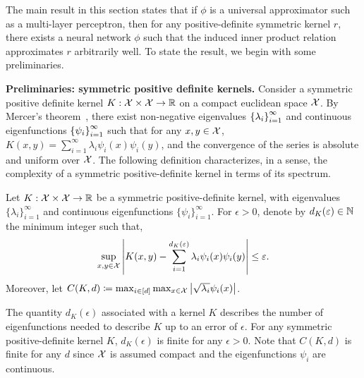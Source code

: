 The main result in this section states that if $\phi$ is a universal approximator such as a multi-layer perceptron, then for any positive-definite symmetric kernel $r$, there exists a neural network $\phi$ such that the induced inner product relation approximates $r$ arbitrarily well. To state the result, we begin with some preliminaries.

\textbf{Preliminaries: symmetric positive definite kernels.} Consider a symmetric positive definite kernel $K: {\mathcal{X}} \times {\mathcal{X}} \to \mathbb{R}$ on a compact euclidean space ${\mathcal{X}}$. By Mercer's theorem~\parencite{mercerFunctionsPositive1909, sunMercerTheorem2005, micchelliUniversalKernels2006}, there exist non-negative eigenvalues $\left\{\lambda_i\right\}_{i=1}^{\infty}$ and continuous eigenfunctions $\left\{\psi_i\right\}_{i=1}^{\infty}$ such that for any $x,y \in {\mathcal{X}}$, $K(x, y) = \sum_{i=1}^\infty \lambda_i \psi_i(x) \psi_i(y)$, and the convergence of the series is absolute and uniform over ${\mathcal{X}}$. The following definition characterizes, in a sense, the complexity of a symmetric positive-definite kernel in terms of its spectrum.

\begin{assumption}\label{ass:sym_pd_ker_specturm_decay}
	Let $K: {\mathcal{X}} \times {\mathcal{X}} \to \mathbb{R}$ be a symmetric positive-definite kernel, with eigenvalues $\{\lambda_i\}_{i=1}^{\infty}$ and continuous eigenfunctions $\{\psi_i\}_{i=1}^{\infty}$. For $\epsilon > 0$, denote by $d_K(\varepsilon) \in \mathbb{N}$ the minimum integer such that,
	\begin{equation*}
		\sup_{x, y \in \calX} \abs{K(x, y) - \sum_{i=1}^{d_K(\epsilon)} \lambda_i \psi_i(x) \psi_i(y)} \leq \epsilon.
	\end{equation*}
	Moreover, let $C(K, d) \coloneq \max_{i \in [d]} \max_{x \in {\mathcal{X}}} \left\lvert\sqrt{\lambda_i} \psi_i(x)\right\rvert$.%
\end{assumption}

The quantity $d_K(\epsilon)$ associated with a kernel $K$ describes the number of eigenfunctions needed to describe $K$ up to an error of $\epsilon$. For any symmetric positive-definite kernel $K$, $d_K(\epsilon)$ is finite for any $\epsilon > 0$. 
Note that $C(K, d)$ is finite for any $d$ since ${\mathcal{X}}$ is assumed compact and the eigenfunctions $\psi_i$ are continuous. %

